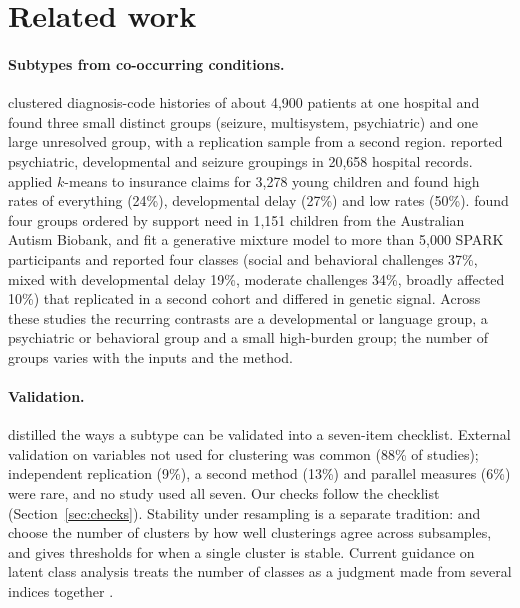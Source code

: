 \section{Related work}
\label{sec:related}

\paragraph{Subtypes from co-occurring conditions.}
\citet{doshivelez2014} clustered diagnosis-code histories of about 4,900 patients at one hospital and found three small distinct groups (seizure, multisystem, psychiatric) and one large unresolved group, with a replication sample from a second region. \citet{lingren2016} reported psychiatric, developmental and seizure groupings in 20,658 hospital records. \citet{vargason2019} applied $k$-means to insurance claims for 3,278 young children and found high rates of everything (24\%), developmental delay (27\%) and low rates (50\%). \citet{montgomery2023} found four groups ordered by support need in 1,151 children from the Australian Autism Biobank, and \citet{litman2025} fit a generative mixture model to more than 5,000 SPARK participants and reported four classes (social and behavioral challenges 37\%, mixed with developmental delay 19\%, moderate challenges 34\%, broadly affected 10\%) that replicated in a second cohort and differed in genetic signal. Across these studies the recurring contrasts are a developmental or language group, a psychiatric or behavioral group and a small high-burden group; the number of groups varies with the inputs and the method.

\paragraph{Validation.}
\citet{agelink2021} distilled the ways a subtype can be validated into a seven-item checklist. External validation on variables not used for clustering was common (88\% of studies); independent replication (9\%), a second method (13\%) and parallel measures (6\%) were rare, and no study used all seven. Our checks follow the checklist (Section~\ref{sec:checks}). Stability under resampling is a separate tradition: \citet{benhur2002} and \citet{lange2004} choose the number of clusters by how well clusterings agree across subsamples, and \citet{hennig2007} gives thresholds for when a single cluster is stable. Current guidance on latent class analysis treats the number of classes as a judgment made from several indices together \citep{masyn2013,nylundgibson2018}.

